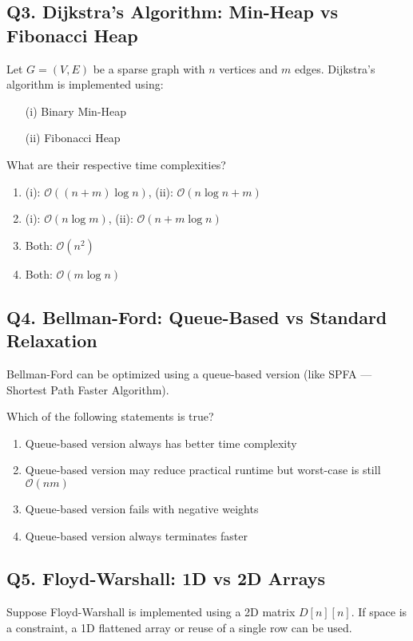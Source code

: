 \vspace{1em}
\subsection*{Q3. Dijkstra's Algorithm: Min-Heap vs Fibonacci Heap}
Let $G = (V, E)$ be a sparse graph with $n$ vertices and $m$ edges. Dijkstra's algorithm is implemented using:

\begin{itemize}
    \item[(i)] Binary Min-Heap
    \item[(ii)] Fibonacci Heap
\end{itemize}

What are their respective time complexities?

\begin{enumerate}[label=(\alph*)]
    \item (i): $\mathcal{O}((n + m) \log n)$, (ii): $\mathcal{O}(n \log n + m)$
    \item (i): $\mathcal{O}(n \log m)$, (ii): $\mathcal{O}(n + m \log n)$
    \item Both: $\mathcal{O}(n^2)$
    \item Both: $\mathcal{O}(m \log n)$
\end{enumerate}

\vspace{1em}
\subsection*{Q4. Bellman-Ford: Queue-Based vs Standard Relaxation}
Bellman-Ford can be optimized using a queue-based version (like SPFA — Shortest Path Faster Algorithm).

Which of the following statements is true?

\begin{enumerate}[label=(\alph*)]
    \item Queue-based version always has better time complexity
    \item Queue-based version may reduce practical runtime but worst-case is still $\mathcal{O}(nm)$
    \item Queue-based version fails with negative weights
    \item Queue-based version always terminates faster
\end{enumerate}

\vspace{1em}
\subsection*{Q5. Floyd-Warshall: 1D vs 2D Arrays}
Suppose Floyd-Warshall is implemented using a 2D matrix $D[n][n]$. If space is a constraint, a 1D flattened array or reuse of a single row can be used.

